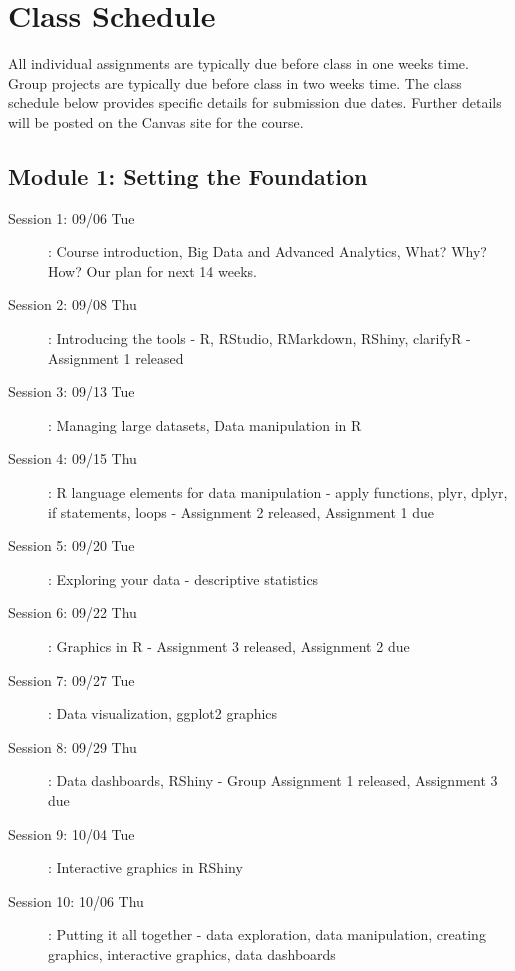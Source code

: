 \documentclass[10pt, letterpaper, twoside]{memoir}\usepackage{knitr}
\begin{document}
\section{Class Schedule}

All individual assignments are typically due before class in one weeks time. Group projects are typically due before class in two weeks time. The class schedule below provides specific details for submission due dates. Further details will be posted on the Canvas site for the course.

\subsection{Module 1: Setting the Foundation}
\begin{description}
\item [Session 1: 09/06 Tue]: Course introduction, Big Data and Advanced Analytics, What? Why? How? Our plan for next 14 weeks.

\item [Session 2: 09/08 Thu]: Introducing the tools - R, RStudio, RMarkdown, RShiny, clarifyR
    - Assignment 1 released

\item [Session 3: 09/13 Tue]: Managing large datasets, Data manipulation in R

\item [Session 4: 09/15 Thu]: R language elements for data manipulation - apply functions, plyr, dplyr, if statements, loops
    - Assignment 2 released, Assignment 1 due

\item [Session 5: 09/20 Tue]: Exploring your data - descriptive statistics
    
\item [Session 6: 09/22 Thu]: Graphics in R
    - Assignment 3 released, Assignment 2 due
    
\item [Session 7: 09/27 Tue]: Data visualization, ggplot2 graphics
    
\item [Session 8: 09/29 Thu]: Data dashboards, RShiny
    - Group Assignment 1 released, Assignment 3 due

\item [Session 9: 10/04 Tue]: Interactive graphics in RShiny

\item [Session 10: 10/06 Thu]: Putting it all together - data exploration, data manipulation, creating graphics, interactive graphics, data dashboards
\end{description}
\end{document}
